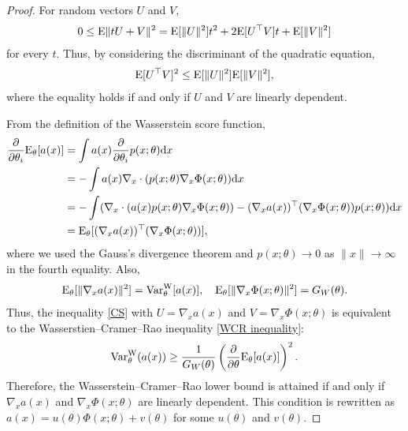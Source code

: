 \documentclass[11pt, a4paper]{article}
\begin{document}
\begin{proof}
	For random vectors $U$ and $V$, 
	\begin{align*}
		0 \leq {\rm E} \| tU+V \|^2 = {\rm E} [\| U \|^2] t^2 + 2 {\rm E} [U^{\top} V] t + {\rm E} [\| V \|^2]
	\end{align*}
	for every $t$.
	Thus, by considering the discriminant of the quadratic equation,
	\begin{align}
		{\rm E} [U^{\top} V]^2 \leq {\rm E} [\| U \|^2] {\rm E} [\| V \|^2], \label{CS}
	\end{align}
	where the equality holds if and only if $U$ and $V$ are linearly dependent.
	
	From the definition of the Wasserstein score function,
	\begin{align*}
		\frac{\partial}{\partial \theta_i} {\rm E}_{\theta} [a(x)] &= \int a(x) \frac{\partial}{\partial \theta_i} p(x; \theta) {\rm d} x \\
		&= -\int a(x) \nabla_{x} \cdot (p(x; \theta) \nabla_{x} \Phi(x; \theta)) {\rm d} x \\
		&= -\int (\nabla_{x} \cdot (a(x) p(x; \theta) \nabla_{{x}} \Phi(x; \theta)) - (\nabla_{{x}} a(x))^{\top} (\nabla_{{x}} \Phi(x; \theta)) p(x; \theta) ) {\rm d} x \\
		&= {\rm E}_{\theta} [(\nabla_{{x}} a(x))^{\top} (\nabla_{{x}} \Phi(x; \theta))],
	\end{align*}
	where we used the Gauss's divergence theorem and $p(x; \theta) \to 0$ as $\| x \| \to \infty$ in the fourth equality.
	Also,
	\begin{align*}
		{\rm E}_{\theta} [ \| \nabla_x a(x) \|^2 ] = {\rm Var}_{\theta}^{\mathrm{W}} [a(x)] , \quad {\rm E}_{\theta} [ \| \nabla_x \Phi(x; \theta) \|^2 ] = G_W (\theta).
	\end{align*}
	Thus, the inequality \eqref{CS} with $U =\nabla_{x} a(x)$ and $V = \nabla_{x} \Phi(x;\theta)$ is equivalent to the Wasserstien--Cramer--Rao inequality \eqref{WCR inequality}:
	\begin{align*}
		{\rm Var}_{\theta}^{\mathrm{W}}(a(x)) \geq \frac{1}{ G_W(\theta)} \left( \frac{\partial}{\partial \theta} {\rm E}_{\theta}[a(x)]\right)^2.
	\end{align*}
	Therefore, the Wasserstein--Cramer--Rao lower bound is attained if and only if $\nabla_x a(x)$ and $\nabla_x \Phi(x; \theta)$ are linearly dependent.
	This condition is rewritten as $a(x) = u(\theta) \Phi(x; \theta) + v(\theta)$ for some $u(\theta)$ and $v(\theta)$.
\end{proof}
\end{document}
